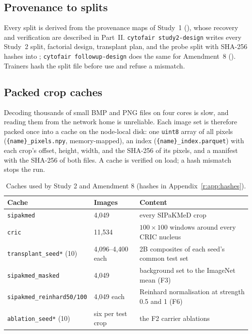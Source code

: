 \subsection{Provenance to splits}

Every split is derived from the provenance maps of Study~1 (), whose recovery and
verification are described in Part~II. \texttt{cytofair study2-design} writes every Study~2 split, factorial design,
transplant plan, and the probe split with SHA-256 hashes into ;
\texttt{cytofair followup-design} does the same for Amendment~8 (). Trainers hash the
split file before use and refuse a mismatch.

\subsection{Packed crop caches}

Decoding thousands of small BMP and PNG files on four cores is slow, and reading them from the network home is
unreliable. Each image set is therefore packed once into a cache on the node-local disk: one \texttt{uint8} array of all
pixels (\texttt{\{name\}\_pixels.npy}, memory-mapped), an index (\texttt{\{name\}\_index.parquet}) with each crop's offset,
height, width, and the SHA-256 of its pixels, and a manifest with the SHA-256 of both files. A cache is verified on load;
a hash mismatch stops the run.

\begin{longtable}{p{}p{}p{}}
\caption{Caches used by Study 2 and Amendment 8 (hashes in Appendix~\ref{r:app:hashes}).}\label{r:tab:caches}\\
\toprule
Cache & Images & Content \\
\midrule
\endfirsthead
\bottomrule
\endfoot
\texttt{sipakmed} & 4,049 & every SIPaKMeD crop \\
\texttt{cric} & 11,534 & $100\times100$ windows around every CRIC nucleus \\
\texttt{transplant\_seed*} (10) & 4,096--4,400 each & 2B composites of each seed's common test set \\
\texttt{sipakmed\_masked} & 4,049 & background set to the ImageNet mean (F3) \\
\texttt{sipakmed\_reinhard50/100} & 4,049 each & Reinhard normalisation at strength 0.5 and 1 (F6) \\
\texttt{ablation\_seed*} (10) & six per test crop & the F2 carrier ablations \\
\end{longtable}

